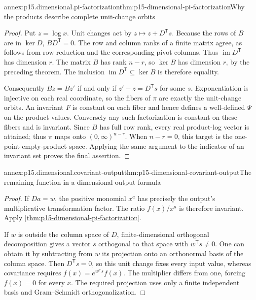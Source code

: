 \begin{annexitem}{annex:p15.dimensional.pi-factorization}{thm:p15-dimensional-pi-factorization}{Why the products describe complete unit-change orbits}
\begin{proof}
Put \(z=\log x\). Unit changes act by \(z\mapsto z+D^{\mathsf T}s\).
Because the rows of \(B\) are in \(\ker D\), \(BD^{\mathsf T}=0\).
The row and column ranks of a finite matrix agree, as follows from
row reduction and the corresponding pivot columns. Thus
\(\operatorname{im}D^{\mathsf T}\) has dimension \(r\).
The matrix \(B\) has rank \(n-r\), so
\(\ker B\) has dimension \(r\), by the preceding theorem.
The inclusion \(\operatorname{im}D^{\mathsf T}\subseteq\ker B\)
is therefore equality.

Consequently \(Bz=Bz'\) if and only if \(z'-z=D^{\mathsf T}s\)
for some \(s\). Exponentiation is injective on each real coordinate,
so the fibers of \(\pi\) are exactly the unit-change orbits.
An invariant \(F\) is constant on each fiber and hence defines a
well-defined \(\Psi\) on the product values. Conversely any such
factorization is constant on these fibers and is invariant.
Since \(B\) has full row rank, every real product-log vector is attained;
thus \(\pi\) maps onto \((0,\infty)^{n-r}\).
When \(n-r=0\), this target is the one-point empty-product space.
Applying the same argument to the indicator of an invariant set proves
the final assertion.
\end{proof}
\end{annexitem}

\begin{annexitem}{annex:p15.dimensional.covariant-output}{thm:p15-dimensional-covariant-output}{The remaining function in a dimensional output formula}
\begin{proof}
If \(Da=w\), the positive monomial \(x^a\) has precisely the output's
multiplicative transformation factor. The ratio \(f(x)/x^a\) is therefore
invariant. Apply \cref{thm:p15-dimensional-pi-factorization}.

If \(w\) is outside the column space of \(D\), finite-dimensional
orthogonal decomposition gives a vector \(s\) orthogonal to that space
with \(w^{\mathsf T}s\ne0\). One can obtain it by subtracting from \(w\)
its projection onto an orthonormal basis of the column space.
Then \(D^{\mathsf T}s=0\), so this unit change fixes every input value,
whereas covariance requires \(f(x)=e^{w^{\mathsf T}s}f(x)\).
The multiplier differs from one, forcing \(f(x)=0\) for every \(x\).
The required projection uses only a finite independent basis and
Gram--Schmidt orthogonalization.
\end{proof}
\end{annexitem}

